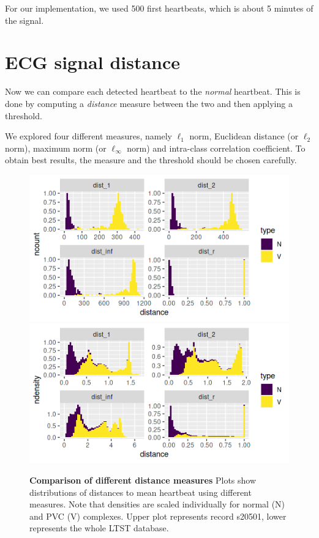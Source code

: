 \documentclass[fleqn,moreauthors,10pt]{ds_report}
\begin{document}
For our implementation, we used 500 first heartbeats, which is about 5 minutes of the signal.

\section*{ECG signal distance}

Now we can compare each detected heartbeat to the \textit{normal} heartbeat. This is done by computing a \textit{distance} measure between the two and then applying a threshold.

We explored four different measures, namely $\ell_1$ norm, Euclidean distance (or $\ell_2$ norm), maximum norm (or $\ell_\infty$ norm) and intra-class correlation coefficient. To obtain best results, the measure and the threshold should be chosen carefully.
\begin{figure}[ht]\centering
	\includegraphics[width=\linewidth]{distances-s20501.png}
	\includegraphics[width=\linewidth]{distances.png}
	\caption{\textbf{Comparison of different distance measures} Plots show distributions of distances to mean heartbeat using different measures. Note that densities are scaled individually for normal (N) and PVC (V) complexes. Upper plot represents record s20501, lower represents the whole LTST database.}
	\label{fig:distance-measures}
\end{figure}
\end{document}
